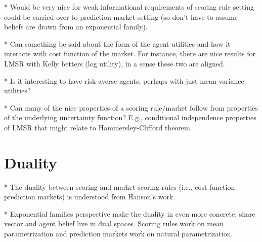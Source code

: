 \documentclass[11pt,letterpaper]{article}
\begin{document}
* Would be very nice for weak informational requirements of scoring rule setting could be carried over to prediction market setting (so don't have to assume beliefs are drawn from an exponential family).

* Can something be said about the form of the agent utilities and how it interacts with cost function of the market. For instance, there are nice results for LMSR with Kelly betters (log utility), in a sense these two are aligned.

* Is it interesting to have risk-averse agents, perhaps with just mean-variance utilities?

* Can many of the nice properties of a scoring rule/market follow from properties of the underlying uncertainty function? E.g., conditional independence properties of LMSR that might relate to Hammersley-Clifford theorem.



\section{Duality}

* The duality between scoring and market scoring rules (i.e., cost function prediction markets) is understood from Hanson's work.

* Exponential families perspective make the duality in even more concrete: share vector and agent belief live in dual spaces. Scoring rules work on mean parametrization and prediction markets work on natural parametrization.



\appendix





\end{document}
